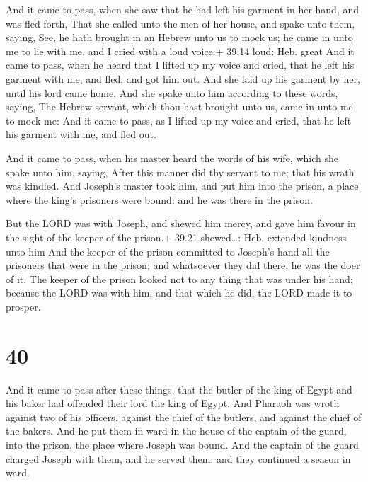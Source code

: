  And it came to pass, when she saw that he had left his
garment in her hand, and was fled forth,  That she called
unto the men of her house, and spake unto them, saying, See, he hath
brought in an Hebrew unto us to mock us; he came in unto me to lie with
me, and I cried with a loud voice:+ 39.14 loud: Heb. great 
And it came to pass, when he heard that I lifted up my voice and cried,
that he left his garment with me, and fled, and got him out.
 And she laid up his garment by her, until his lord came
home.  And she spake unto him according to these words,
saying, The Hebrew servant, which thou hast brought unto us, came in
unto me to mock me:  And it came to pass, as I lifted up my
voice and cried, that he left his garment with me, and fled out.

 And it came to pass, when his master heard the words of
his wife, which she spake unto him, saying, After this manner did thy
servant to me; that his wrath was kindled.  And Joseph's
master took him, and put him into the prison, a place where the king's
prisoners were bound: and he was there in the prison.

 But the LORD was with Joseph, and shewed him mercy, and
gave him favour in the sight of the keeper of the prison.+ 39.21
shewed\ldots: Heb. extended kindness unto him  And the
keeper of the prison committed to Joseph's hand all the prisoners that
were in the prison; and whatsoever they did there, he was the doer of
it.  The keeper of the prison looked not to any thing that
was under his hand; because the LORD was with him, and that which he
did, the LORD made it to prosper.

\hypertarget{section-39}{%
\section{40}\label{section-39}}

 And it came to pass after these things, that the butler of
the king of Egypt and his baker had offended their lord the king of
Egypt.  And Pharaoh was wroth against two of his officers,
against the chief of the butlers, and against the chief of the bakers.
 And he put them in ward in the house of the captain of the
guard, into the prison, the place where Joseph was bound. 
And the captain of the guard charged Joseph with them, and he served
them: and they continued a season in ward.

